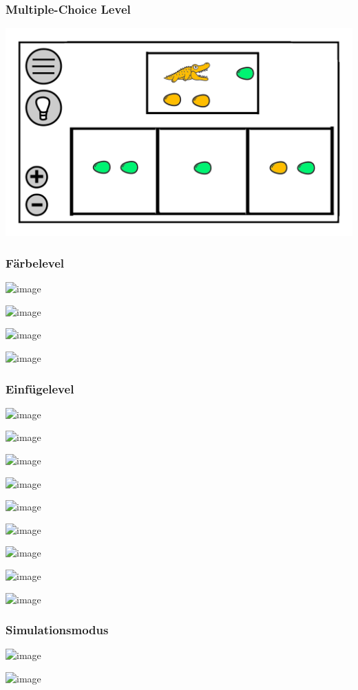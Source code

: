 \documentclass[t]{beamer}
\begin{document}
\begin{frame}
	\frametitle{Multiple-Choice Level}
	\includegraphics[width=\textwidth]{level_choice.png}
\end{frame}
\begin{frame}
	\frametitle{Färbelevel}
	\includegraphics<1>[width=\textwidth]{level_white.png}\pause
	
	\includegraphics<2>[width=\textwidth]{level_end_color.png}

	\includegraphics<3>[width=\textwidth]{level_color.png}

	\includegraphics<4>[width=\textwidth]{level_colored_egg.png}
\end{frame}
\begin{frame}
	\frametitle{Einfügelevel}
	\includegraphics<1>[width=\textwidth]{level_start.png}

	\includegraphics<2>[width=\textwidth]{level_end.png}

	\includegraphics<3>[width=\textwidth]{level_croc.png}

	\includegraphics<4>[width=\textwidth]{level_color_purple.png}

	\includegraphics<5>[width=\textwidth]{level_colored_croc.png}

	\includegraphics<6>[width=\textwidth]{level_colored_croc0.png}

	\includegraphics<7>[width=\textwidth]{level_colored_croc01.png}

	\includegraphics<8>[width=\textwidth]{level_colored_croc1.png}

	\includegraphics<9>[width=\textwidth]{level_colored_croc2.png}
\end{frame}
\begin{frame}
	\frametitle{Simulationsmodus}
	\includegraphics<1>[width=\textwidth]{level_simulation_croc.png}

	\includegraphics<2>[width=\textwidth]{level_simulation_solved.png}
\end{frame}
\end{document}
